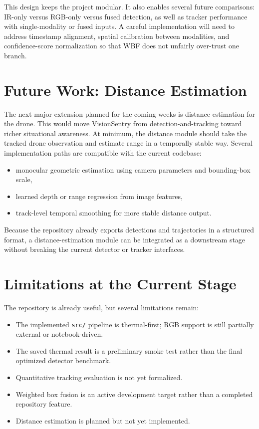 \documentclass[10pt,conference]{IEEEtran}
\begin{document}
This design keeps the project modular. It also enables several future comparisons: IR-only versus RGB-only versus fused detection, as well as tracker performance with single-modality or fused inputs. A careful implementation will need to address timestamp alignment, spatial calibration between modalities, and confidence-score normalization so that WBF does not unfairly over-trust one branch.

\section{Future Work: Distance Estimation}
The next major extension planned for the coming weeks is distance estimation for the drone. This would move VisionSentry from detection-and-tracking toward richer situational awareness. At minimum, the distance module should take the tracked drone observation and estimate range in a temporally stable way. Several implementation paths are compatible with the current codebase:

\begin{itemize}[leftmargin=1.5em]
    \item monocular geometric estimation using camera parameters and bounding-box scale,
    \item learned depth or range regression from image features,
    \item track-level temporal smoothing for more stable distance output.
\end{itemize}

Because the repository already exports detections and trajectories in a structured format, a distance-estimation module can be integrated as a downstream stage without breaking the current detector or tracker interfaces.

\section{Limitations at the Current Stage}
The repository is already useful, but several limitations remain:

\begin{itemize}[leftmargin=1.5em]
    \item The implemented \texttt{src/} pipeline is thermal-first; RGB support is still partially external or notebook-driven.
    \item The saved thermal result is a preliminary smoke test rather than the final optimized detector benchmark.
    \item Quantitative tracking evaluation is not yet formalized.
    \item Weighted box fusion is an active development target rather than a completed repository feature.
    \item Distance estimation is planned but not yet implemented.
\end{itemize}
\end{document}
